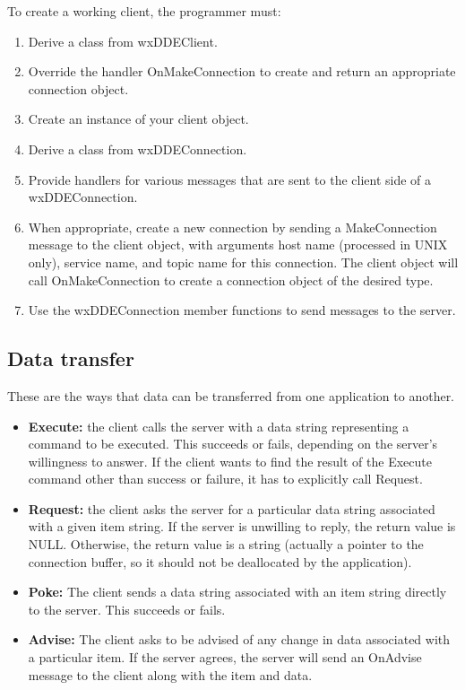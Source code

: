 To create a working client, the programmer must:

\begin{enumerate}\itemsep=0pt
\item Derive a class from wxDDEClient.
\item Override the handler OnMakeConnection to create and return
an appropriate connection object.
\item Create an instance of your client object.
\item Derive a class from wxDDEConnection.
\item Provide handlers for various messages that are sent to the client
side of a wxDDEConnection.
\item When appropriate, create a new connection by sending a MakeConnection
message to the client object, with arguments host name (processed in UNIX only),
service name, and topic name for this connection. The client object will call OnMakeConnection
to create a connection object of the desired type.
\item Use the wxDDEConnection member functions to send messages to the server.
\end{enumerate}

\subsection{Data transfer}

These are the ways that data can be transferred from one application to
another.

\begin{itemize}\itemsep=0pt
\item {\bf Execute:} the client calls the server with a data string representing
a command to be executed. This succeeds or fails, depending on the
server's willingness to answer. If the client wants to find the result
of the Execute command other than success or failure, it has to explicitly
call Request.
\item {\bf Request:} the client asks the server for a particular data string
associated with a given item string. If the server is unwilling to
reply, the return value is NULL. Otherwise, the return value is a string
(actually a pointer to the connection buffer, so it should not be
deallocated by the application).
\item {\bf Poke:} The client sends a data string associated with an item
string directly to the server. This succeeds or fails.
\item {\bf Advise:} The client asks to be advised of any change in data
associated with a particular item. If the server agrees, the server will
send an OnAdvise message to the client along with the item and data.
\end{itemize}


